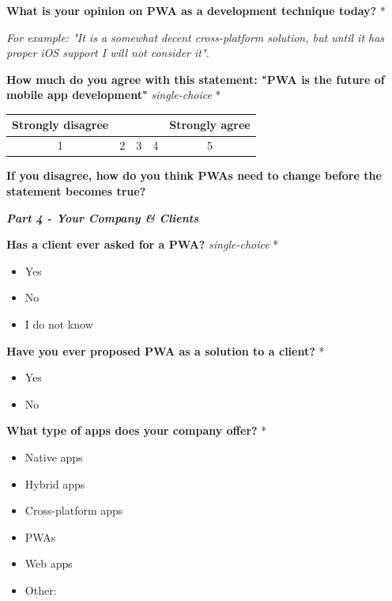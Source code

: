 \documentclass[a4paper,12pt]{article}
\begin{document}
\textbf{What is your opinion on PWA as a development technique today?} *

\textit{For example: "It is a somewhat decent cross-platform solution, but until it has proper iOS support I will not consider it".}

\quad

\textbf{How much do you agree with this statement: "PWA is the future of mobile app development"} \textit{single-choice}  *

\begin{tabular}{ccccc}
    Strongly disagree & & & & Strongly agree \\
    \hline
    \multicolumn{1}{|c|}{1} & \multicolumn{1}{c|}{2} & \multicolumn{1}{c|}{3} & \multicolumn{1}{c|}{4} & \multicolumn{1}{c|}{5} \\
     \hline
\end{tabular}

\quad

\quad

\textbf{If you disagree, how do you think PWAs need to change before the statement becomes true?}

\quad

\quad

\textbf{\textit{Part 4 - Your Company \& Clients}}

\textbf{Has a client ever asked for a PWA?} \textit{single-choice} *
\begin{itemize}
    \item Yes
    \item No
    \item I do not know
\end{itemize}

\textbf{Have you ever proposed PWA as a solution to a client?} *
\begin{itemize}
    \item Yes
    \item No
\end{itemize}

\textbf{What type of apps does your company offer?} *
\begin{itemize}
    \item Native apps
    \item Hybrid apps
    \item Cross-platform apps
    \item PWAs
    \item Web apps
    \item Other:
\end{itemize}
\quad
\end{document}
